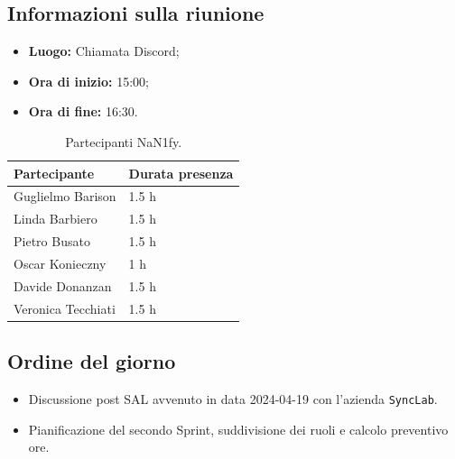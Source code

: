 \documentclass[8pt]{article}
\begin{document}
\subsection{Informazioni sulla riunione}
\begin{itemize}
	\setlength\itemsep{0em}
	\item\textbf{Luogo:} Chiamata Discord;
	\item\textbf{Ora di inizio:} 15:00;
	\item\textbf{Ora di fine:}  16:30.
\end{itemize}
\begin{table}[ht!]
	\begin{minipage}[t]{0.5\linewidth}
		\centering
		\begin{tabular}{p{3cm} p{3cm}}
			\toprule
			\textbf{Partecipante} & \textbf{Durata presenza} \\
			\midrule
			Guglielmo Barison & 1.5 h \\
			Linda Barbiero &  1.5 h \\
			Pietro Busato & 1.5 h \\
			Oscar Konieczny & 1 h \\
			Davide Donanzan & 1.5 h \\
			Veronica Tecchiati & 1.5 h \\
			\bottomrule
		\end{tabular}
		\caption{Partecipanti NaN1fy.}
		\label{table:Partecipanti NaN1fy}
	\end{minipage}
\end{table}
\subsection{Ordine del giorno}
\begin{itemize}
	\setlength\itemsep{0em}
	\item Discussione post SAL avvenuto in data 2024-04-19 con l'azienda \texttt{SyncLab}.
	\item Pianificazione del secondo Sprint, suddivisione dei ruoli e calcolo preventivo ore.
\end{itemize}
\end{document}
